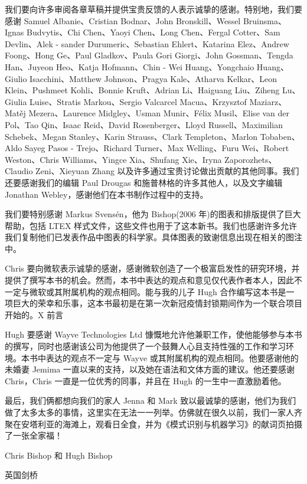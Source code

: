 \documentclass[10pt]{report}
\begin{document}
我们要向许多审阅各章草稿并提供宝贵反馈的人表示诚挚的感谢。特别地，我们要感谢 Samuel Albanie、Cristian Bodnar、John Bronskill、Wessel Bruinsma、Ignas Budvytis、Chi Chen、Yaoyi Chen、Long Chen、Fergal Cotter、Sam Devlin、Alek - sander Durumeric、Sebastian Ehlert、Katarina Elez、Andrew Foong、Hong Ge、Paul Gladkov、Paula Gori Giorgi、John Gossman、Tengda Han、Juyeon Heo、Katja Hofmann、Chin - Wei Huang、Yongchaio Huang、Giulio Isacchini、Matthew Johnson、Pragya Kale、Atharva Kelkar、Leon Klein、Pushmeet Kohli、Bonnie Kruft、Adrian Li、Haiguang Liu、Ziheng Lu、Giulia Luise、Stratis Markou、Sergio Valcarcel Macua、Krzysztof Maziarz、Matěj Mezera、Laurence Midgley、Usman Munir、Félix Musil、Elise van der Pol、Tao Qin、Isaac Reid、David Rosenberger、Lloyd Russell、Maximilian Schebek、Megan Stanley、Karin Strauss、Clark Templeton、Marlon Tobaben、Aldo Sayeg Pasos - Trejo、Richard Turner、Max Welling、Furu Wei、Robert Weston、Chris Williams、Yingce Xia、Shufang Xie、Iryna Zaporozhets、Claudio Zeni、Xieyuan Zhang 以及许多通过宝贵讨论做出贡献的其他同事。我们还要感谢我们的编辑 Paul Drougas 和施普林格的许多其他人，以及文字编辑 Jonathan Webley，感谢他们在本书制作过程中的支持。

我们要特别感谢 Markus Svensén，他为 Bishop(2006 年)的图表和排版提供了巨大帮助，包括 LTEX 样式文件，这些文件也用于了这本新书。我们也感谢许多允许我们复制他们已发表作品中图表的科学家。具体图表的致谢信息出现在相关的图注中。

Chris 要向微软表示诚挚的感谢，感谢微软创造了一个极富启发性的研究环境，并提供了撰写本书的机会。然而，本书中表达的观点和意见仅代表作者本人，因此不一定与微软或其附属机构的观点相同。能与我的儿子 Hugh 合作编写这本书是一项巨大的荣幸和乐事，这本书最初是在第一次新冠疫情封锁期间作为一个联合项目开始的。X 前言

Hugh 要感谢 Wayve Technologies Ltd 慷慨地允许他兼职工作，使他能够参与本书的撰写，同时也感谢该公司为他提供了一个鼓舞人心且支持性强的工作和学习环境。本书中表达的观点不一定与 Wayve 或其附属机构的观点相同。他要感谢他的未婚妻 Jemima 一直以来的支持，以及她在语法和文体方面的建议。他还要感谢 Chris，Chris 一直是一位优秀的同事，并且在 Hugh 的一生中一直激励着他。

最后，我们俩都想向我们的家人 Jenna 和 Mark 致以最诚挚的感谢，他们为我们做了太多太多的事情，这里实在无法一一列举。仿佛就在很久以前，我们一家人齐聚在安塔利亚的海滩上，观看日全食，并为《模式识别与机器学习》的献词页拍摄了一张全家福！

Chris Bishop 和 Hugh Bishop

英国剑桥
\end{document}
